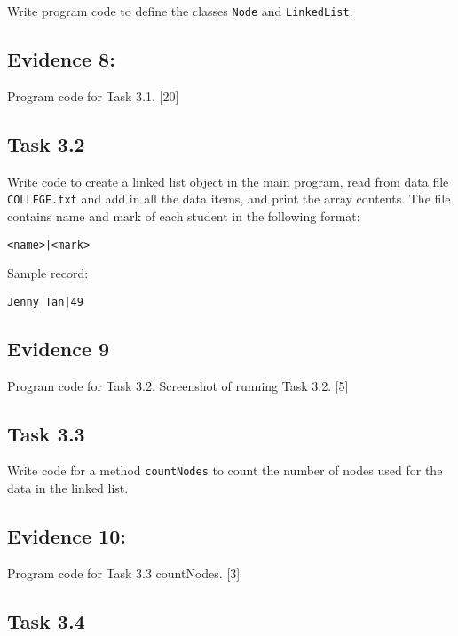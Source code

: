 Write program code to define the classes \texttt{Node} and \texttt{LinkedList}.

\subsection*{Evidence 8: }

Program code for Task 3.1. \hfill{} {[}20{]}

\subsection*{Task 3.2 }

Write code to create a linked list object in the main program, read
from data file \texttt{COLLEGE.txt} and add in all the data items,
and print the array contents. The file contains name and mark of each
student in the following format:
\noindent \begin{center}
\texttt{<name>|<mark>}
\par\end{center}

Sample record: 
\noindent \begin{center}
\texttt{Jenny Tan|49}
\par\end{center}

\subsection*{Evidence 9 }

Program code for Task 3.2. Screenshot of running Task 3.2. \hfill{}
{[}5{]}

\subsection*{Task 3.3 }

Write code for a method \texttt{countNodes} to count the number of
nodes used for the data in the linked list. 

\subsection*{Evidence 10:}

Program code for Task 3.3 countNodes. \hfill{}{[}3{]}

\subsection*{Task 3.4 }

